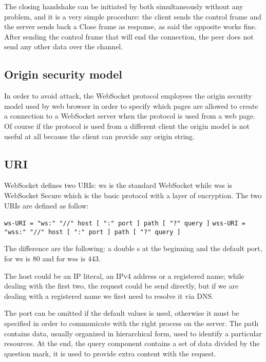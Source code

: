 The closing handshake can be initiated by both simultaneously without any problem, and it is a very simple procedure:
the client sends the control frame and the server sends back a Close frame as response, as said the opposite works fine.\newline
After sending the control frame that will end the connection, the peer does not send any other data over the channel.

\subsection{Origin security model}
In order to avoid attack, the WebSocket protocol employees the origin security model used by web browser in order
to specify which pages are allowed to create a connection to a WebSocket server when the protocol is used from a web page.\newline
Of course if the protocol is used from a different client the origin model is not useful at all because the client can provide any origin string.

\subsection{URI}
WebSocket defines two URIs: ws is the standard WebSocket while wss is WebSocket Secure which is the basic protocol with a layer of encryption.\newline
The two URIs are defined as follow:\newline

\texttt{ws-URI = "ws:" "//" host [ ":" port ] path [ "?" query ]}\newline
\texttt{wss-URI = "wss:" "//" host [ ":" port ] path [ "?" query ]}\newline

The difference are the following: a double s at the beginning and the default port, for ws is 80 and for wss is 443.\newline

The host could be an IP literal, an IPv4 address or a registered name; while dealing with the first two, the request could be send directly, but if we are dealing with a registered name we first need to resolve it via DNS.\newline

The port can be omitted if the default values is used, otherwise it must be specified in order to communicate with the right process on the server.\newline
The path contains data, usually organized in hierarchical form, used to identify a particular resources.\newline
At the end, the query component contains a set of data divided by the question mark, it is used to provide extra content with the request.\newline

